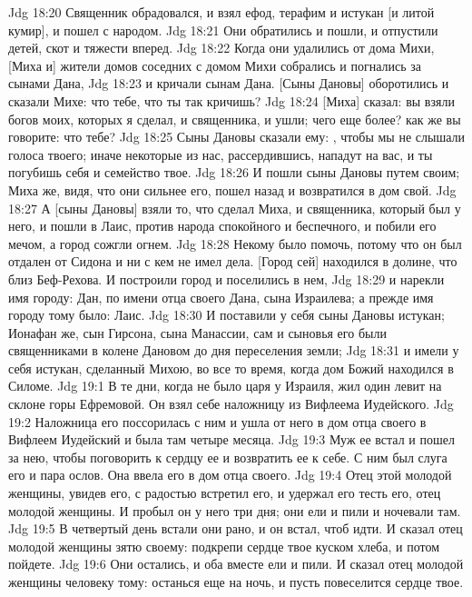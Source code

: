\vs Jdg 18:20 Священник обрадовался, и взял ефод, терафим и истукан [и литой кумир], и пошел с народом.
\vs Jdg 18:21 Они обратились и пошли, и отпустили детей, скот и тяжести вперед.
\vs Jdg 18:22 Когда они удалились от дома Михи, [Миха и] жители домов соседних с домом Михи собрались и погнались за сынами Дана,
\vs Jdg 18:23 и кричали сынам Дана. [Сыны Дановы] оборотились и сказали Михе: что тебе, что ты так кричишь?
\vs Jdg 18:24 [Миха] сказал: вы взяли богов моих, которых я сделал, и священника, и ушли; чего еще более? как же вы говорите: что тебе?
\vs Jdg 18:25 Сыны Дановы сказали ему: , чтобы мы не слышали голоса твоего; иначе некоторые из нас, рассердившись, нападут на вас, и ты погубишь себя и семейство твое.
\vs Jdg 18:26 И пошли сыны Дановы путем своим; Миха же, видя, что они сильнее его, пошел назад и возвратился в дом свой.
\vs Jdg 18:27 А [сыны Дановы] взяли то, что сделал Миха, и священника, который был у него, и пошли в Лаис, против народа спокойного и беспечного, и побили его мечом, а город сожгли огнем.
\vs Jdg 18:28 Некому было помочь, потому что он был отдален от Сидона и ни с кем не имел дела. [Город сей] находился в долине, что близ Беф-Рехова. И построили  город и поселились в нем,
\vs Jdg 18:29 и нарекли имя городу: Дан, по имени отца своего Дана, сына Израилева; а прежде имя городу тому было: Лаис.
\vs Jdg 18:30 И поставили у себя сыны Дановы истукан; Ионафан же, сын Гирсона, сына Манассии, сам и сыновья его были священниками в колене Дановом до дня переселения  земли;
\vs Jdg 18:31 и имели у себя истукан, сделанный Михою, во все то время, когда дом Божий находился в Силоме.
\vs Jdg 19:1 В те дни, когда не было царя у Израиля, жил один левит на склоне горы Ефремовой. Он взял себе наложницу из Вифлеема Иудейского.
\vs Jdg 19:2 Наложница его поссорилась с ним и ушла от него в дом отца своего в Вифлеем Иудейский и была там четыре месяца.
\vs Jdg 19:3 Муж ее встал и пошел за нею, чтобы поговорить к сердцу ее и возвратить ее к себе. С ним был слуга его и пара ослов. Она ввела его в дом отца своего.
\vs Jdg 19:4 Отец этой молодой женщины, увидев его, с радостью встретил его, и удержал его тесть его, отец молодой женщины. И пробыл он у него три дня; они ели и пили и ночевали там.
\vs Jdg 19:5 В четвертый день встали они рано, и он встал, чтоб идти. И сказал отец молодой женщины зятю своему: подкрепи сердце твое куском хлеба, и потом пойдете.
\vs Jdg 19:6 Они остались, и оба вместе ели и пили. И сказал отец молодой женщины человеку тому: останься еще на ночь, и пусть повеселится сердце твое.
